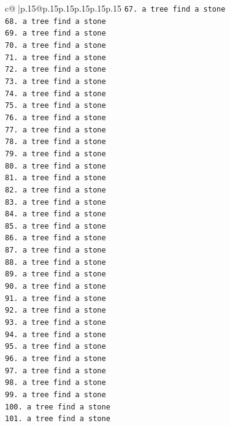 \documentclass{article}
\begin{document}
{\begin{supertabular}{c@{$\;$}|p{.15\linewidth}@{}p{.15\linewidth}p{.15\linewidth}p{.15\linewidth}p{.15\linewidth}p{.15\linewidth}}
{{{\texttt{67. a tree find a stone} \\
\texttt{68. a tree find a stone} \\
\texttt{69. a tree find a stone} \\
\texttt{70. a tree find a stone} \\
\texttt{71. a tree find a stone} \\
\texttt{72. a tree find a stone} \\
\texttt{73. a tree find a stone} \\
\texttt{74. a tree find a stone} \\
\texttt{75. a tree find a stone} \\
\texttt{76. a tree find a stone} \\
\texttt{77. a tree find a stone} \\
\texttt{78. a tree find a stone} \\
\texttt{79. a tree find a stone} \\
\texttt{80. a tree find a stone} \\
\texttt{81. a tree find a stone} \\
\texttt{82. a tree find a stone} \\
\texttt{83. a tree find a stone} \\
\texttt{84. a tree find a stone} \\
\texttt{85. a tree find a stone} \\
\texttt{86. a tree find a stone} \\
\texttt{87. a tree find a stone} \\
\texttt{88. a tree find a stone} \\
\texttt{89. a tree find a stone} \\
\texttt{90. a tree find a stone} \\
\texttt{91. a tree find a stone} \\
\texttt{92. a tree find a stone} \\
\texttt{93. a tree find a stone} \\
\texttt{94. a tree find a stone} \\
\texttt{95. a tree find a stone} \\
\texttt{96. a tree find a stone} \\
\texttt{97. a tree find a stone} \\
\texttt{98. a tree find a stone} \\
\texttt{99. a tree find a stone} \\
\texttt{100. a tree find a stone} \\
\texttt{101. a tree find a stone} \\
}}}
\end{supertabular}}
\end{document}
